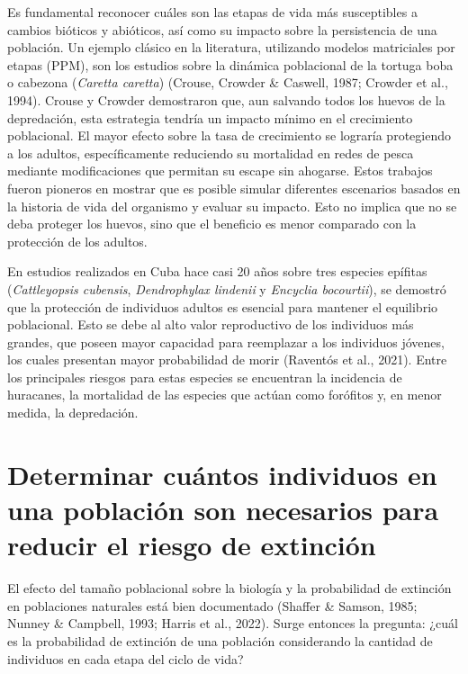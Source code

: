 \documentclass[
  12pt,
  letterpaper,
]{book}
\begin{document}
Es fundamental reconocer cuáles son las etapas de vida más susceptibles
a cambios bióticos y abióticos, así como su impacto sobre la
persistencia de una población. Un ejemplo clásico en la literatura,
utilizando modelos matriciales por etapas (PPM), son los estudios sobre
la dinámica poblacional de la tortuga boba o cabezona (\emph{Caretta
caretta}) (Crouse, Crowder \& Caswell, 1987; Crowder et al., 1994).
Crouse y Crowder demostraron que, aun salvando todos los huevos de la
depredación, esta estrategia tendría un impacto mínimo en el crecimiento
poblacional. El mayor efecto sobre la tasa de crecimiento se lograría
protegiendo a los adultos, específicamente reduciendo su mortalidad en
redes de pesca mediante modificaciones que permitan su escape sin
ahogarse. Estos trabajos fueron pioneros en mostrar que es posible
simular diferentes escenarios basados en la historia de vida del
organismo y evaluar su impacto. Esto no implica que no se deba proteger
los huevos, sino que el beneficio es menor comparado con la protección
de los adultos.

En estudios realizados en Cuba hace casi 20 años sobre tres especies
epífitas (\emph{Cattleyopsis cubensis}, \emph{Dendrophylax lindenii} y
\emph{Encyclia bocourtii}), se demostró que la protección de individuos
adultos es esencial para mantener el equilibrio poblacional. Esto se
debe al alto valor reproductivo de los individuos más grandes, que
poseen mayor capacidad para reemplazar a los individuos jóvenes, los
cuales presentan mayor probabilidad de morir (Raventós et al., 2021).
Entre los principales riesgos para estas especies se encuentran la
incidencia de huracanes, la mortalidad de las especies que actúan como
forófitos y, en menor medida, la depredación.

\section{Determinar cuántos individuos en una población son necesarios
para reducir el riesgo de
extinción}\label{determinar-cuuxe1ntos-individuos-en-una-poblaciuxf3n-son-necesarios-para-reducir-el-riesgo-de-extinciuxf3n}

El efecto del tamaño poblacional sobre la biología y la probabilidad de
extinción en poblaciones naturales está bien documentado (Shaffer \&
Samson, 1985; Nunney \& Campbell, 1993; Harris et al., 2022). Surge
entonces la pregunta: ¿cuál es la probabilidad de extinción de una
población considerando la cantidad de individuos en cada etapa del ciclo
de vida?
\end{document}
